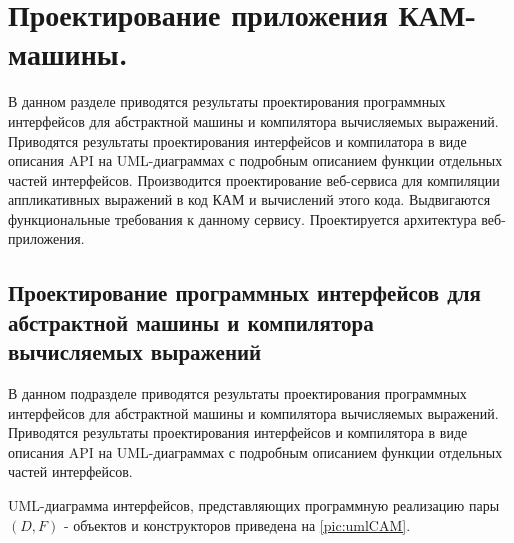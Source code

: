 \chapter{Проектирование приложения КАМ-машины.}


\begin{annotation}
	В данном разделе приводятся результаты проектирования программных интерфейсов для абстрактной машины и компилятора вычисляемых выражений. Приводятся результаты проектирования интерфейсов и компилатора в виде описания API на UML-диаграммах с подробным описанием функции отдельных частей интерфейсов. Производится проектирование веб-сервиса для компиляции аппликативных выражений в код КАМ и вычислений этого кода. Выдвигаются функциональные требования к данному сервису. Проектируется архитектура веб-приложения.
\end{annotation}

\section{Проектирование программных интерфейсов для абстрактной машины и компилятора вычисляемых выражений}

\begin{annotation}
	В данном подразделе приводятся результаты проектирования программных интерфейсов для абстрактной машины и компилятора вычисляемых выражений. Приводятся результаты проектирования интерфейсов и компилятора в виде описания API на UML-диаграммах с подробным описанием функции отдельных частей интерфейсов.
\end{annotation}

UML-диаграмма интерфейсов, представляющих программную реализацию пары $(D, F)$ - объектов и конструкторов приведена на \ref{pic:umlCAM}.



